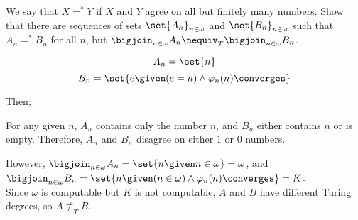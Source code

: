 \begin{problem}
  We say that $X =^\ast Y$ if $X$ and $Y$ agree on all but
  finitely many numbers.
  Show that there are sequences of sets
  $\set{A_n}_{n \in \omega}$ and $\set{B_n}_{n \in \omega}$
  such that $A_n =^\ast B_n$ for all $n$,
  but $\displaystyle \bigjoin_{n \in \omega} A_n \nequiv_T \bigjoin_{n \in \omega} B_n$.

  \begin{answer}
    \[ A_n = \set{ n }\]
    \[ B_n = \set{e \given (e = n) \land \varphi_n(n) \converges} \]

    Then;
    \begin{enumarabic}
      \item For any given $n$, $A_n$ contains only the number $n$,
        and $B_n$ either contains $n$ or is empty.
        Therefore, $A_n$ and $B_n$ disagree on either $1$ or $0$ numbers.
      \item However,
        $\displaystyle\bigjoin_{n \in \omega} A_n = \set{ n \given n \in \omega} = \omega$,
        and $\displaystyle\bigjoin_{n \in \omega} B_n = \set{ n \given (n \in \omega) \land \varphi_n(n) \converges } = K$. \\
        Since $\omega$ is computable but $K$ is not computable,
        $A$ and $B$ have different Turing degrees,
        so $A \nequiv_T B$.
    \end{enumarabic}
  \end{answer}
\end{problem}
